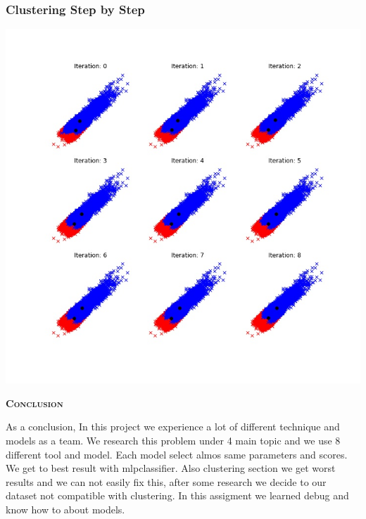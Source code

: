 \documentclass[a4paper]{article}
\begin{document}
\medskip

\subsubsection{Clustering Step by Step}
\includegraphics[width=.9\linewidth]{graphs/kmeans_clustering_progress.jpeg}


\pagebreak

\textsc{\LARGE \bf Conclusion}\\
\medskip

As a conclusion, In this project we experience a lot of different technique and models as a team. We research this problem under 4 main topic and we use 8 different tool and model. Each model select almos same parameters and scores. We get to best result with mlpclassifier. Also clustering section we get worst results and we can not easily fix this, after some research we decide to our dataset not compatible with clustering. In this assigment we learned debug and know how to about models.
\end{document}
